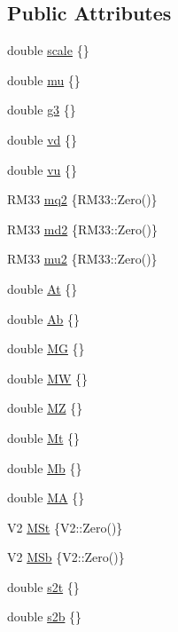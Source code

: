\subsection*{Public Attributes}
\begin{DoxyCompactItemize}
\item 
double \hyperlink{structhimalaya_1_1Parameters_a88f2975f66e3b8bc32f973606f2579c4}{scale} \{\}
\item 
double \hyperlink{structhimalaya_1_1Parameters_ac3b46727f8e81adce0d984fe118ad8ba}{mu} \{\}
\item 
double \hyperlink{structhimalaya_1_1Parameters_a728fe0a5f7e390f3f165fbc536002296}{g3} \{\}
\item 
double \hyperlink{structhimalaya_1_1Parameters_a109a6a905bbc8963010571546dd2f11b}{vd} \{\}
\item 
double \hyperlink{structhimalaya_1_1Parameters_aa3c40d7f24703d8fba20e9b23ae95c4d}{vu} \{\}
\item 
R\+M33 \hyperlink{structhimalaya_1_1Parameters_a0df106ebf113926e6fa1c47ca0c3123e}{mq2} \{R\+M33\+::\+Zero()\}
\item 
R\+M33 \hyperlink{structhimalaya_1_1Parameters_a816c90360f6140e1f9c147efcdbe7ac2}{md2} \{R\+M33\+::\+Zero()\}
\item 
R\+M33 \hyperlink{structhimalaya_1_1Parameters_a2b2c94041a50cae06d1488dd403fec07}{mu2} \{R\+M33\+::\+Zero()\}
\item 
double \hyperlink{structhimalaya_1_1Parameters_a8843e5d6997fcf2af27eed6a18e86631}{At} \{\}
\item 
double \hyperlink{structhimalaya_1_1Parameters_a678741a0f129445f10e4baef797b1241}{Ab} \{\}
\item 
double \hyperlink{structhimalaya_1_1Parameters_a3d42cda935b85168742dcd960d667501}{MG} \{\}
\item 
double \hyperlink{structhimalaya_1_1Parameters_a901124ec812d32656ed0a1cc7b3ae07c}{MW} \{\}
\item 
double \hyperlink{structhimalaya_1_1Parameters_adab7c0a5e2ea82e8a6ce209e424e3254}{MZ} \{\}
\item 
double \hyperlink{structhimalaya_1_1Parameters_ad2b817fb45673b04ba2aac183b2719c3}{Mt} \{\}
\item 
double \hyperlink{structhimalaya_1_1Parameters_aa2e33485d4234974d0a93af49ea5df7d}{Mb} \{\}
\item 
double \hyperlink{structhimalaya_1_1Parameters_a8cd4adb5c71cd896e95f4e4873e1a125}{MA} \{\}
\item 
V2 \hyperlink{structhimalaya_1_1Parameters_a628b2a3f3c04ebc009a1f982dae144b9}{M\+St} \{V2\+::\+Zero()\}
\item 
V2 \hyperlink{structhimalaya_1_1Parameters_acac147286ca9263f5fdba7a718c17506}{M\+Sb} \{V2\+::\+Zero()\}
\item 
double \hyperlink{structhimalaya_1_1Parameters_a0f85389598077341d20683c371a8d1be}{s2t} \{\}
\item 
double \hyperlink{structhimalaya_1_1Parameters_ae6574cf2bb33e968f3285167941cd696}{s2b} \{\}
\end{DoxyCompactItemize}


